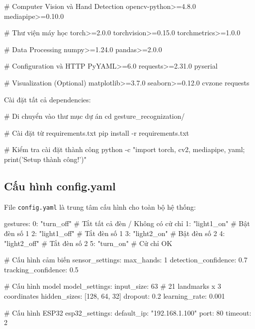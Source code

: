\begin{aivncodebox}
\begin{python}
# Computer Vision và Hand Detection
opencv-python>=4.8.0
mediapipe>=0.10.0

# Thư viện máy học
torch>=2.0.0
torchvision>=0.15.0
torchmetrics>=1.0.0

# Data Processing
numpy>=1.24.0
pandas>=2.0.0

# Configuration và HTTP
PyYAML>=6.0
requests>=2.31.0
pyserial

# Visualization (Optional)
matplotlib>=3.7.0
seaborn>=0.12.0
cvzone
requests

\end{python}
\end{aivncodebox}

Cài đặt tất cả dependencies:

\begin{aivncodebox}
\begin{python}
# Di chuyển vào thư mục dự án
cd gesture_recognization/

# Cài đặt từ requirements.txt
pip install -r requirements.txt

# Kiểm tra cài đặt thành công
python -c "import torch, cv2, mediapipe, yaml; print('Setup thành công!')"
\end{python}
\end{aivncodebox}


\subsection{Cấu hình config.yaml}

File \texttt{config.yaml} là trung tâm cấu hình cho toàn bộ hệ thống:

\begin{aivncodebox}
\begin{python}
gestures:
  0: "turn_off"      # Tắt tất cả đèn / Không có cử chỉ
  1: "light1_on"     # Bật đèn số 1
  2: "light1_off"    # Tắt đèn số 1  
  3: "light2_on"     # Bật đèn số 2
  4: "light2_off"    # Tắt đèn số 2
  5: "turn_on"       # Cử chỉ OK 

# Cấu hình cảm biến
sensor_settings:
  max_hands: 1
  detection_confidence: 0.7
  tracking_confidence: 0.5

# Cấu hình model
model_settings:
  input_size: 63        # 21 landmarks x 3 coordinates
  hidden_sizes: [128, 64, 32]
  dropout: 0.2
  learning_rate: 0.001

# Cấu hình ESP32
esp32_settings:
  default_ip: "192.168.1.100"
  port: 80
  timeout: 2

\end{python}
\end{aivncodebox}

